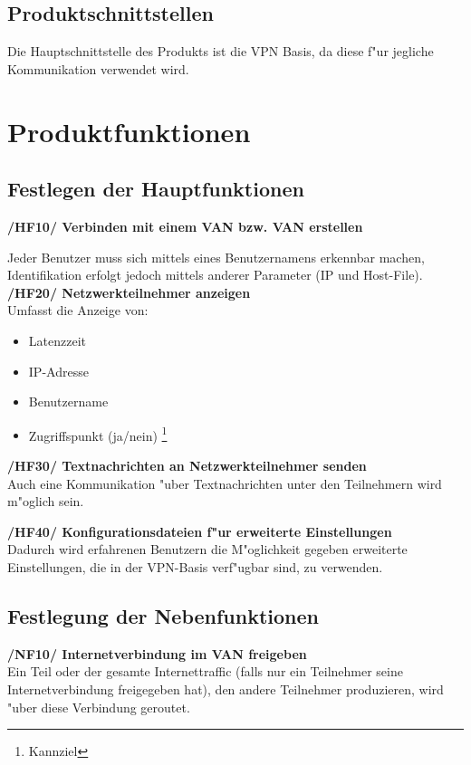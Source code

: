 \documentclass[a4paper,12pt]{scrreprt}
\begin{document}
	\section{Produktschnittstellen}
		
		Die Hauptschnittstelle des Produkts ist die VPN Basis, da diese f"ur jegliche Kommunikation verwendet wird. 
		
\chapter{Produktfunktionen}
		\section{Festlegen der Hauptfunktionen}
			\textbf{/HF10/ Verbinden mit einem VAN bzw. VAN erstellen}
					
					Jeder Benutzer muss sich mittels eines Benutzernamens erkennbar machen, Identifikation erfolgt jedoch mittels anderer Parameter (IP und Host-File). \\
					
					
					\textbf {/HF20/ Netzwerkteilnehmer anzeigen
					}\\
					Umfasst die Anzeige von:
					
					\begin{itemize}
					\item Latenzzeit
					\item IP-Adresse
					\item Benutzername
					\item Zugriffspunkt (ja/nein) \footnote{Kannziel}\\
					\end{itemize}
					
					
					
					
					
					\textbf {/HF30/ Textnachrichten an Netzwerkteilnehmer senden}
					\\Auch eine Kommunikation "uber Textnachrichten unter den Teilnehmern wird m"oglich sein.
					
					 \textbf {/HF40/ Konfigurationsdateien f"ur erweiterte Einstellungen}
					\\Dadurch wird erfahrenen Benutzern die M"oglichkeit gegeben erweiterte Einstellungen, die in der VPN-Basis verf"ugbar sind, zu verwenden.
			
		\section{Festlegung der Nebenfunktionen}
		\textbf { /NF10/ Internetverbindung im VAN freigeben} 
			\\Ein Teil oder der gesamte Internettraffic (falls nur ein Teilnehmer seine Internetverbindung freigegeben hat), den andere Teilnehmer produzieren, wird "uber diese Verbindung geroutet.
					
\end{document}

